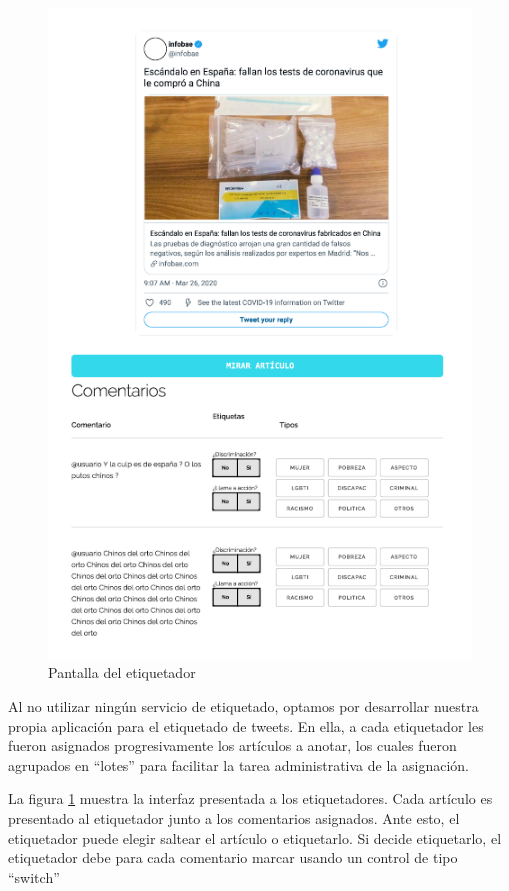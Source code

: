 \begin{figure}
    \centering
    \includegraphics[width=\textwidth]{img/labeler.pdf}
    \caption{Pantalla del etiquetador}
    \label{fig:labeler_example}
\end{figure}

Al no utilizar ningún servicio de etiquetado, optamos por desarrollar nuestra propia aplicación para el etiquetado de tweets. En ella, a cada etiquetador les fueron asignados progresivamente los artículos a anotar, los cuales fueron agrupados en ``lotes'' para facilitar la tarea administrativa de la asignación.

La figura \ref{fig:labeler_example} muestra la interfaz presentada a los etiquetadores. Cada artículo es presentado al etiquetador junto a los comentarios asignados. Ante esto, el etiquetador puede elegir saltear el artículo o etiquetarlo. Si decide etiquetarlo, el etiquetador debe para cada comentario marcar usando un control de tipo ``switch''

